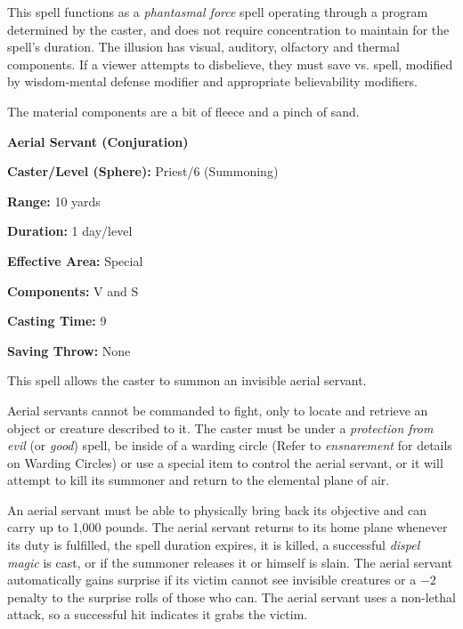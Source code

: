 \begin{multicols}{2}
This spell functions as a \textit{phantasmal force} spell operating through a program determined by the caster, and does not require concentration to maintain for the spell's duration.  The illusion has visual, auditory, olfactory and thermal components.  If a viewer attempts to disbelieve, they must save vs. spell, modified by wisdom-mental defense modifier and appropriate believability modifiers.  

The material components are a bit of fleece and a pinch of sand.

\vspace{1em}

\noindent
\begin{minipage}{\columnwidth}

\noindent \textbf{Aerial Servant (Conjuration)}

\noindent \textbf{Caster/Level (Sphere):} Priest/6 (Summoning)

\noindent \textbf{Range:} 10 yards

\noindent \textbf{Duration:} 1 day/level

\noindent \textbf{Effective Area:} Special

\noindent \textbf{Components:} V and S

\noindent \textbf{Casting Time:} 9

\noindent \textbf{Saving Throw:} None

\end{minipage}

This spell allows the caster to summon an invisible aerial servant.  

Aerial servants cannot be commanded to fight, only to locate and retrieve an object or creature described to it.  The caster must be under a \textit{protection from evil} (or \textit{good}) spell, be inside of a warding circle (Refer to \textit{ensnarement} for details on Warding Circles) or use a special item to control the aerial servant, or it will attempt to kill its summoner and return to the elemental plane of air. 

An aerial servant must be able to physically bring back its objective and can carry up to 1,000 pounds.  The aerial servant returns to its home plane whenever its duty is fulfilled, the spell duration expires, it is killed, a successful \textit{dispel magic} is cast, or if the summoner releases it or himself is slain.  The aerial servant automatically gains surprise if its victim cannot see invisible creatures or a $-2$ penalty to the surprise rolls of those who can.  The aerial servant uses a non-lethal attack, so a successful hit indicates it grabs the victim.


\end{multicols}
